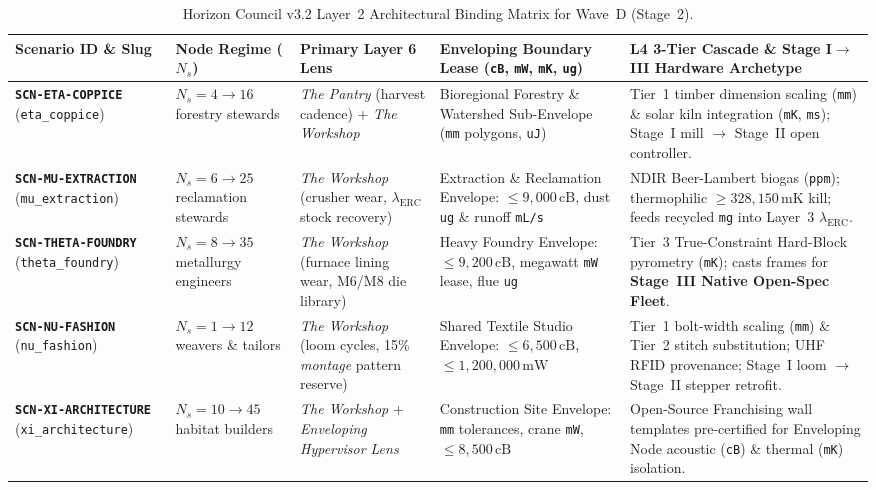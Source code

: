 \begin{table}[htbp]
\centering
\caption{Horizon Council v3.2 Layer~2 Architectural Binding Matrix for Wave~D (Stage~2).}
\label{tab:l2-wave-d-matrix}
\footnotesize
\begin{tabular}{@{}p{2.5cm}p{2.0cm}p{2.8cm}p{3.1cm}p{3.3cm}@{}}
\toprule
\textbf{Scenario ID \& Slug} & \textbf{Node Regime ($N_s$)} & \textbf{Primary Layer 6 Lens} & \textbf{Enveloping Boundary Lease (\texttt{cB}, \texttt{mW}, \texttt{mK}, \texttt{ug})} & \textbf{L4 3-Tier Cascade \& Stage I$\to$III Hardware Archetype} \\
\midrule
\textbf{\texttt{SCN-ETA-COPPICE}} (\texttt{eta\_coppice}) & $N_s = 4 \to 16$ forestry stewards & \textit{The Pantry} (harvest cadence) + \textit{The Workshop} & Bioregional Forestry \& Watershed Sub-Envelope (\texttt{mm} polygons, \texttt{uJ}) & Tier~1 timber dimension scaling (\texttt{mm}) \& solar kiln integration (\texttt{mK}, \texttt{ms}); Stage~I mill $\to$ Stage~II open controller. \\
\addlinespace[3pt]
\textbf{\texttt{SCN-MU-EXTRACTION}} (\texttt{mu\_extraction}) & $N_s = 6 \to 25$ reclamation stewards & \textit{The Workshop} (crusher wear, $\lambda_{\mathrm{ERC}}$ stock recovery) & Extraction \& Reclamation Envelope: $\le 9{,}000\,\mathrm{cB}$, dust \texttt{ug} \& runoff \texttt{mL/s} & NDIR Beer-Lambert biogas (\texttt{ppm}); thermophilic $\ge 328{,}150\,\mathrm{mK}$ kill; feeds recycled \texttt{mg} into Layer~3 $\lambda_{\mathrm{ERC}}$. \\
\addlinespace[3pt]
\textbf{\texttt{SCN-THETA-FOUNDRY}} (\texttt{theta\_foundry}) & $N_s = 8 \to 35$ metallurgy engineers & \textit{The Workshop} (furnace lining wear, M6/M8 die library) & Heavy Foundry Envelope: $\le 9{,}200\,\mathrm{cB}$, megawatt \texttt{mW} lease, flue \texttt{ug} & Tier~3 True-Constraint Hard-Block pyrometry (\texttt{mK}); casts frames for \textbf{Stage~III Native Open-Spec Fleet}. \\
\addlinespace[3pt]
\textbf{\texttt{SCN-NU-FASHION}} (\texttt{nu\_fashion}) & $N_s = 1 \to 12$ weavers \& tailors & \textit{The Workshop} (loom cycles, 15\% \textit{montage} pattern reserve) & Shared Textile Studio Envelope: $\le 6{,}500\,\mathrm{cB}$, $\le 1{,}200{,}000\,\mathrm{mW}$ & Tier~1 bolt-width scaling (\texttt{mm}) \& Tier~2 stitch substitution; UHF RFID provenance; Stage~I loom $\to$ Stage~II stepper retrofit. \\
\addlinespace[3pt]
\textbf{\texttt{SCN-XI-ARCHITECTURE}} (\texttt{xi\_architecture}) & $N_s = 10 \to 45$ habitat builders & \textit{The Workshop} + \textit{Enveloping Hypervisor Lens} & Construction Site Envelope: \texttt{mm} tolerances, crane \texttt{mW}, $\le 8{,}500\,\mathrm{cB}$ & Open-Source Franchising wall templates pre-certified for Enveloping Node acoustic (\texttt{cB}) \& thermal (\texttt{mK}) isolation. \\
\bottomrule
\end{tabular}
\end{table}

